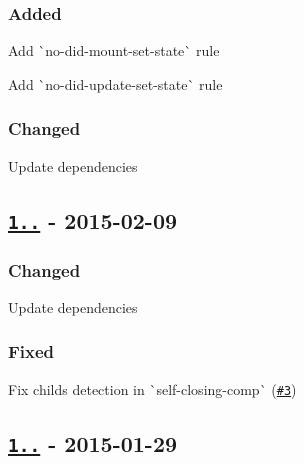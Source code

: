 \subsubsection*{Added}


\begin{DoxyItemize}
\item Add \`{}no-\/did-\/mount-\/set-\/state\`{} rule
\item Add \`{}no-\/did-\/update-\/set-\/state\`{} rule
\end{DoxyItemize}

\subsubsection*{Changed}


\begin{DoxyItemize}
\item Update dependencies
\end{DoxyItemize}

\subsection*{\href{https://github.com/yannickcr/eslint-plugin-react/compare/v1.2.1...v1.2.2}{\tt 1..} -\/ 2015-\/02-\/09}

\subsubsection*{Changed}


\begin{DoxyItemize}
\item Update dependencies
\end{DoxyItemize}

\subsubsection*{Fixed}


\begin{DoxyItemize}
\item Fix childs detection in \`{}self-\/closing-\/comp\`{} (\href{https://github.com/yannickcr/eslint-plugin-react/issues/3}{\tt \#3})
\end{DoxyItemize}

\subsection*{\href{https://github.com/yannickcr/eslint-plugin-react/compare/v1.2.0...v1.2.1}{\tt 1..} -\/ 2015-\/01-\/29}

